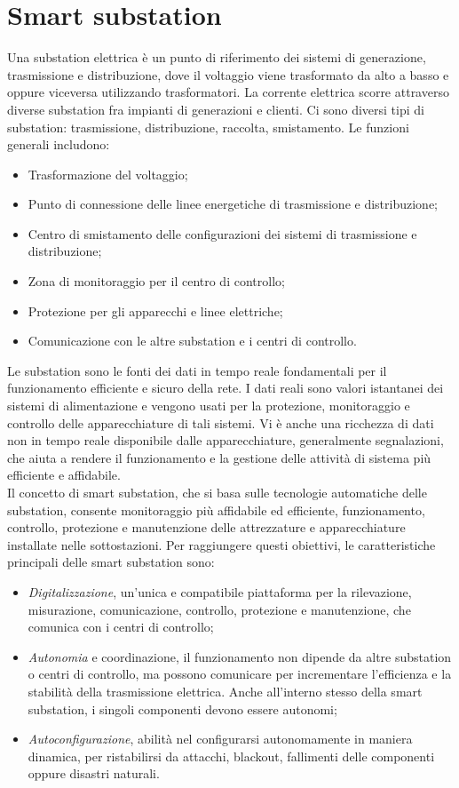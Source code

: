 \section{Smart substation}
Una substation elettrica è un punto di riferimento dei sistemi di generazione, trasmissione e distribuzione, dove il voltaggio viene trasformato da alto a basso e oppure viceversa utilizzando trasformatori. La corrente elettrica scorre attraverso diverse substation fra impianti di generazioni e clienti. Ci sono diversi tipi di substation: trasmissione, distribuzione, raccolta, smistamento. Le funzioni generali includono:
\begin{itemize}
	\item Trasformazione del voltaggio;
	\item Punto di connessione delle linee energetiche di trasmissione e distribuzione;
	\item Centro di smistamento delle configurazioni dei sistemi di trasmissione e distribuzione;
	\item Zona di monitoraggio per il centro di controllo;
	\item Protezione per gli apparecchi e linee elettriche;
	\item Comunicazione con le altre substation e i centri di controllo. 
\end{itemize} 
Le substation sono le fonti dei dati in tempo reale fondamentali per il funzionamento efficiente e sicuro della rete. I dati reali sono valori istantanei dei sistemi di alimentazione e vengono usati per la protezione, monitoraggio e controllo delle apparecchiature di tali sistemi. Vi è anche una ricchezza di dati non in tempo reale disponibile dalle apparecchiature, generalmente segnalazioni, che aiuta a rendere il funzionamento e la gestione delle attività di sistema più efficiente e affidabile.
\\
Il concetto di smart substation, che si basa sulle tecnologie automatiche delle substation, consente monitoraggio più affidabile ed efficiente, funzionamento, controllo, protezione e manutenzione delle attrezzature e apparecchiature installate nelle sottostazioni. Per raggiungere questi obiettivi, le caratteristiche principali delle smart substation sono:
\begin{itemize}
	\item \emph{Digitalizzazione}, un'unica e compatibile piattaforma per la rilevazione, misurazione, comunicazione, controllo, protezione e manutenzione, che comunica con i centri di controllo;
	\item \emph{Autonomia} e {coordinazione}, il funzionamento non dipende da altre substation o centri di controllo, ma possono comunicare per incrementare l'efficienza e la stabilità della trasmissione elettrica. Anche all'interno stesso della smart substation, i singoli componenti devono essere autonomi;
	\item \emph{Autoconfigurazione}, abilità nel configurarsi autonomamente in maniera dinamica, per ristabilirsi da attacchi, blackout, fallimenti delle componenti oppure disastri naturali.   
\end{itemize}   

